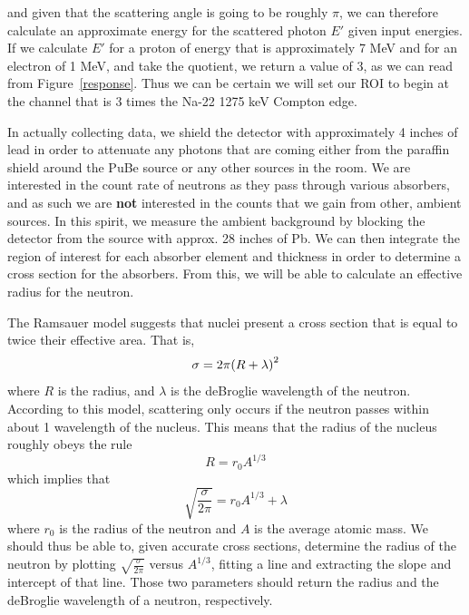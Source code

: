 \documentclass{article}
\DeclarePairedDelimiter{\parens}{\lparen}{\rparen}
\begin{document}
  and given that the scattering angle is going to be roughly $\pi$, we can therefore calculate an approximate energy for the scattered photon $E'$ given input energies.  If we calculate $E'$ for a proton of energy that is approximately 7 MeV and for an electron of 1 MeV, and take the quotient, we return a value of 3, as we can read from Figure~\ref{response}. Thus we can be certain we will set our ROI to begin at the channel that is 3 times the Na-22 1275 keV Compton edge.

  \hspace{.25cm}

  In actually collecting data, we shield the detector with approximately 4 inches of lead in order to attenuate any photons that are coming either from the paraffin shield around the PuBe source or any other sources in the room.  We are interested in the count rate of neutrons as they pass through various absorbers, and as such we are \textbf{not} interested in the counts that we gain from other, ambient sources.  In this spirit, we measure the ambient background by blocking the detector from the source with approx. 28 inches of Pb.  We can then integrate the region of interest for each absorber element and thickness in order to determine a cross section for the absorbers.  From this, we will be able to calculate an effective radius for the neutron.

  \hspace{.25cm}

  The Ramsauer model suggests that nuclei present a cross section that is equal to twice their effective area.  That is,
  \begin{equation*}
    \sigma = 2\pi\parens*{R + \lambda}^2
  \end{equation*}
  where $R$ is the radius, and $\lambda$ is the deBroglie wavelength of the neutron.  According to this model, scattering only occurs if the neutron passes within about 1 wavelength of the nucleus.  This means that the radius of the nucleus roughly obeys the rule
  \begin{equation*}
    R = r_0A^{1/3}
  \end{equation*}
  which implies that
  \begin{equation*}
    \sqrt{\frac{\sigma}{2\pi}} = r_0 A^{1/3} + \lambda
  \end{equation*}
  where $r_0$ is the radius of the neutron and $A$ is the average atomic mass.  We should thus be able to, given accurate cross sections, determine the radius of the neutron by plotting $\sqrt{\frac{\sigma}{2\pi}}$ versus $A^{1/3}$, fitting a line and extracting the slope and intercept of that line.  Those two parameters should return the radius and the deBroglie wavelength of a neutron, respectively.
\end{document}
